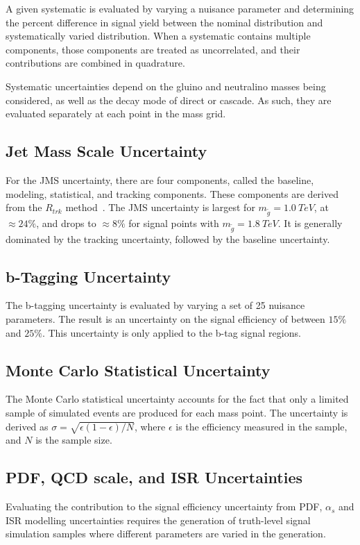 A given systematic is evaluated by varying a nuisance parameter and
determining the percent difference in signal yield between the nominal
distribution and systematically varied distribution.
When a systematic contains multiple components, those components are treated as
uncorrelated, and their contributions are combined in quadrature.

Systematic uncertainties depend on the gluino and neutralino masses
being considered, as well as the decay mode of direct or cascade.
As such, they are evaluated separately at each point in the mass grid.

\subsection{Jet Mass Scale Uncertainty}\label{subsec:signal_jms_uncertainty}
For the JMS uncertainty, there are four components, called the
baseline, modeling, statistical, and tracking components.
These components are derived from the $R_{trk}$ method~\cite{jet-substructure-perf}.
The JMS uncertainty is largest for $m_{\tilde{g}}=1.0~TeV$, at $\approx 24\%$, and drops to $\approx 8\%$
for signal points with $m_{\tilde{g}}=1.8~TeV$.
It is generally dominated by the tracking uncertainty, followed by the baseline uncertainty.

\subsection{b-Tagging Uncertainty}\label{subsec:signal_btag_uncertainty}
The b-tagging uncertainty is evaluated by varying a set of 25 nuisance parameters.
The result is an uncertainty on the signal efficiency of between $15\%$ and $25\%$.
This uncertainty is only applied to the b-tag signal regions.

\subsection{Monte Carlo Statistical Uncertainty}\label{subsec:signal_mc_uncertainty}
The Monte Carlo statistical uncertainty accounts for the fact that only a limited sample of simulated events are
produced for each mass point.
The uncertainty is derived as $\sigma=\sqrt{\epsilon(1-\epsilon)/N}$, where $\epsilon$ is the
efficiency measured in the sample, and $N$ is the sample size.


\subsection{PDF, QCD scale, and ISR Uncertainties}\label{subsec:signal_qcd_uncertainty}
Evaluating the contribution to the signal efficiency uncertainty from PDF, $\alpha_s$ and ISR modelling uncertainties
requires the generation of truth-level signal simulation samples where different parameters are varied in the generation.

